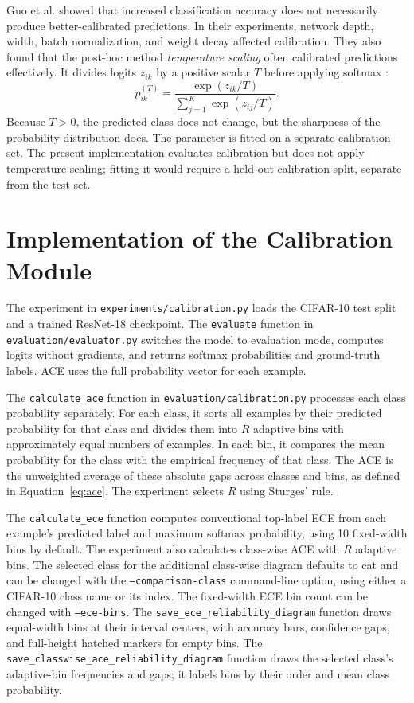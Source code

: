 \documentclass[12pt,a4paper]{article}
\begin{document}
Guo et al. showed that increased classification accuracy does not necessarily produce better-calibrated predictions. In their experiments, network depth, width, batch normalization, and weight decay affected calibration. They also found that the post-hoc method \emph{temperature scaling} often calibrated predictions effectively. It divides logits $z_{ik}$ by a positive scalar $T$ before applying softmax \cite{guo2017calibration}:
\begin{equation}
    p_{ik}^{(T)}=\frac{\exp(z_{ik}/T)}{\sum_{j=1}^{K}\exp(z_{ij}/T)}.
    \label{eq:temperature-scaling}
\end{equation}
Because $T>0$, the predicted class does not change, but the sharpness of the probability distribution does. The parameter is fitted on a separate calibration set. The present implementation evaluates calibration but does not apply temperature scaling; fitting it would require a held-out calibration split, separate from the test set.

\section{Implementation of the Calibration Module}

The experiment in \texttt{experiments/calibration.py} loads the CIFAR-10 test split and a trained ResNet-18 checkpoint. The \texttt{evaluate} function in \texttt{evaluation/evaluator.py} switches the model to evaluation mode, computes logits without gradients, and returns softmax probabilities and ground-truth labels. ACE uses the full probability vector for each example.

The \texttt{calculate\_ace} function in \texttt{evaluation/calibration.py} processes each class probability separately. For each class, it sorts all examples by their predicted probability for that class and divides them into $R$ adaptive bins with approximately equal numbers of examples. In each bin, it compares the mean probability for the class with the empirical frequency of that class. The ACE is the unweighted average of these absolute gaps across classes and bins, as defined in Equation~\eqref{eq:ace}. The experiment selects $R$ using Sturges' rule.

The \texttt{calculate\_ece} function computes conventional top-label ECE from each example's predicted label and maximum softmax probability, using 10 fixed-width bins by default. The experiment also calculates class-wise ACE with $R$ adaptive bins. The selected class for the additional class-wise diagram defaults to cat and can be changed with the \texttt{--comparison-class} command-line option, using either a CIFAR-10 class name or its index. The fixed-width ECE bin count can be changed with \texttt{--ece-bins}. The \texttt{save\_ece\_reliability\_diagram} function draws equal-width bins at their interval centers, with accuracy bars, confidence gaps, and full-height hatched markers for empty bins. The \texttt{save\_classwise\_ace\_reliability\_diagram} function draws the selected class's adaptive-bin frequencies and gaps; it labels bins by their order and mean class probability.
\end{document}
